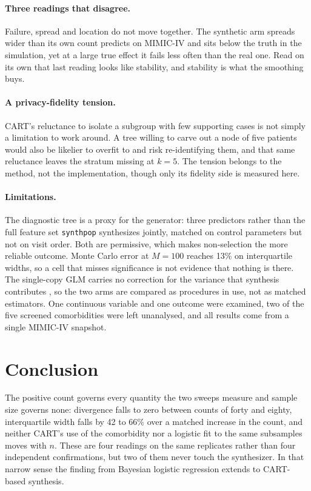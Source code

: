\documentclass[11pt]{article}
\begin{document}
\paragraph{Three readings that disagree.}
Failure, spread and location do not move together. The synthetic arm spreads
wider than its own count predicts on MIMIC-IV and sits below the truth in the
simulation, yet at a large true effect it fails less often than the real one.
Read on its own that last reading looks like stability, and stability is what
the smoothing buys.

\paragraph{A privacy-fidelity tension.}
CART's reluctance to isolate a subgroup with few supporting cases is not simply a
limitation to work around. A tree willing to carve out a node of five patients
would also be likelier to overfit to and risk re-identifying them, and that same
reluctance leaves the stratum missing at $k = 5$. The tension belongs to the
method, not the implementation, though only its fidelity side is measured
here.

\paragraph{Limitations.}
The diagnostic tree is a proxy for the generator: three predictors rather than
the full feature set \texttt{synthpop} synthesizes jointly, matched on control
parameters but not on visit order. Both are permissive, which makes
non-selection the more reliable outcome. Monte Carlo error at $M = 100$ reaches
13\% on interquartile widths, so a cell that misses significance is not evidence
that nothing is there. The single-copy GLM carries no correction for the
variance that synthesis contributes \cite{raab2016}, so the two arms are
compared as procedures in use, not as matched estimators. One continuous variable and one
outcome were examined, two of the five screened comorbidities were left
unanalysed, and all results come from a single MIMIC-IV snapshot.

\section{Conclusion}

The positive count governs every quantity the two sweeps measure and sample size
governs none: divergence falls to zero between counts of forty and eighty,
interquartile width falls by 42 to 66\% over a matched increase in the count, and
neither CART's use of the comorbidity nor a logistic fit to the same subsamples
moves with $n$. These are four readings on the same replicates rather than four
independent confirmations, but two of them never touch the synthesizer. In that
narrow sense the finding from Bayesian logistic regression extends to CART-based
synthesis.
\end{document}
